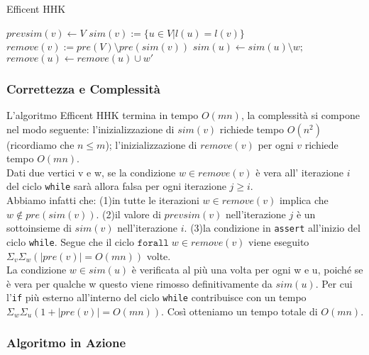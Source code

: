 \begin{algorithm}[H]
\caption{Efficent HHK}
\begin{algorithmic}[1]
  \State $prevsim(v) \gets V$
    $sim(v) := \{u \in V|l(u)=l(v)\}$  
  \EndIf
  \State$remove(v):=pre(V)\setminus pre(sim(v))$
\EndFor
{}
        $sim(u)\gets sim(u)\setminus {w};$
            $remove(u)\gets remove(u)\cup{w'}$
          \EndIf
        \EndFor
      \EndIf
    \EndFor  
  \EndFor
\EndWhile
\end{algorithmic}
\end{algorithm}
\subsubsection{Correttezza e Complessità}
L'algoritmo Efficent HHK termina in tempo $O(mn)$, la complessità si compone nel modo seguente: l'inizializzazione di $sim(v)$ richiede tempo $O(n^2)$(ricordiamo che $n \leq m$); l'inizializzazione di $remove(v)$ per ogni $v$ richiede tempo $O(mn)$.\\
Dati due vertici v e w, se la condizione $w \in remove(v)$ è vera all' iterazione $i$ del ciclo \texttt{while} sarà allora falsa per ogni iterazione $j\geq i$.\\ Abbiamo infatti che:  
(1)in tutte le iterazioni $w \in remove(v)$ implica che $w\not\in pre(sim(v))$.
(2)il valore di $prevsim(v)$ nell'iterazione $j$ è un sottoinsieme di $sim(v)$ nell'iterazione $i$.
(3)la condizione in \texttt{assert} all'inizio del ciclo \texttt{while}.
Segue che il ciclo $\mathtt{for all}\;w \in remove(v)$ viene eseguito $\Sigma_v\Sigma_w(|pre(v)|=O(mn))$ volte.\\
La condizione $w \in sim(u)$ è verificata al più una volta per ogni w e u, poiché se è vera per qualche w questo viene rimosso definitivamente da $sim(u)$. Per cui l'\texttt{if} più esterno all'interno del ciclo \texttt{while} contribuisce con un tempo $\Sigma_w\Sigma_u(1+|pre(v)|=O(mn))$. Così otteniamo un tempo totale di $O(mn)$.\\
\subsubsection{Algoritmo in Azione}
